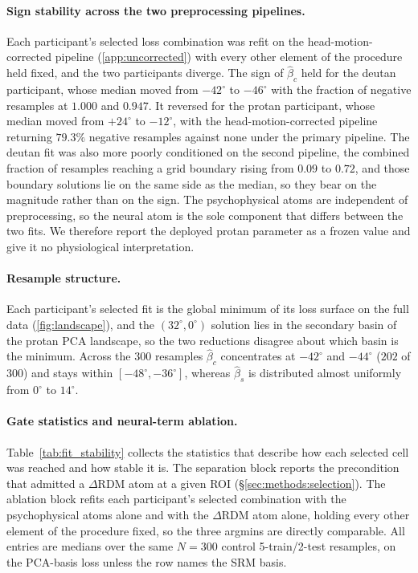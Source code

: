 \paragraph{Sign stability across the two preprocessing pipelines.}
Each participant's selected loss combination was refit on the head-motion-corrected pipeline (\cref{app:uncorrected}) with every other element of the procedure held fixed, and the two participants diverge. The sign of $\hat\beta_c$ held for the deutan participant, whose median moved from $-42^\circ$ to $-46^\circ$ with the fraction of negative resamples at $1.000$ and $0.947$. It reversed for the protan participant, whose median moved from $+24^\circ$ to $-12^\circ$, with the head-motion-corrected pipeline returning $79.3\%$ negative resamples against none under the primary pipeline. The deutan fit was also more poorly conditioned on the second pipeline, the combined fraction of resamples reaching a grid boundary rising from $0.09$ to $0.72$, and those boundary solutions lie on the same side as the median, so they bear on the magnitude rather than on the sign. The psychophysical atoms are independent of preprocessing, so the neural atom is the sole component that differs between the two fits. We therefore report the deployed protan parameter as a frozen value and give it no physiological interpretation.

\paragraph{Resample structure.}
Each participant's selected fit is the global minimum of its loss surface on the full data (\cref{fig:landscape}), and the $(32^\circ, 0^\circ)$ solution lies in the secondary basin of the protan PCA landscape, so the two reductions disagree about which basin is the minimum. Across the 300 resamples $\hat\beta_c$ concentrates at $-42^\circ$ and $-44^\circ$ ($202$ of $300$) and stays within $[-48^\circ, -36^\circ]$, whereas $\hat\beta_s$ is distributed almost uniformly from $0^\circ$ to $14^\circ$.

\paragraph{Gate statistics and neural-term ablation.}
Table~\ref{tab:fit_stability} collects the statistics that describe how each selected cell was reached and how stable it is. The separation block reports the precondition that admitted a $\Delta$RDM atom at a given ROI (\S\ref{sec:methods:selection}). The ablation block refits each participant's selected combination with the psychophysical atoms alone and with the $\Delta$RDM atom alone, holding every other element of the procedure fixed, so the three argmins are directly comparable. All entries are medians over the same $N = 300$ control 5-train/2-test resamples, on the PCA-basis loss unless the row names the SRM basis.

